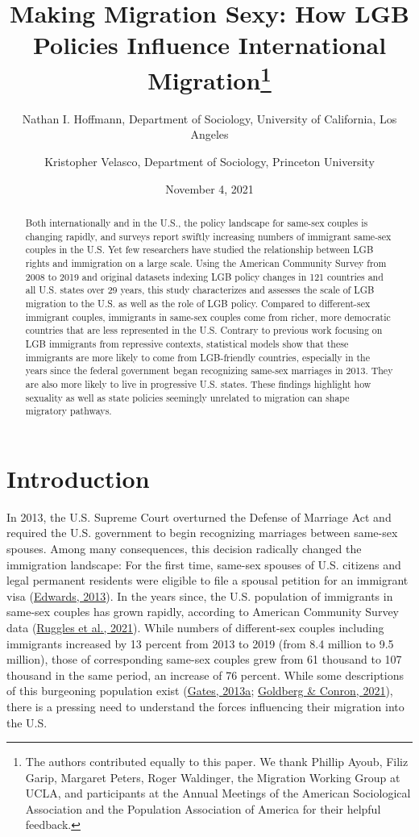 \documentclass[
  12pt,
]{article}
\title{Making Migration Sexy: How LGB Policies Influence International Migration\thanks{The authors contributed equally to this paper. We thank Phillip Ayoub, Filiz Garip, Margaret Peters, Roger Waldinger, the Migration Working Group at UCLA, and participants at the Annual Meetings of the American Sociological Association and the Population Association of America for their helpful feedback.}}
\author{Nathan I. Hoffmann, Department of Sociology, University of California, Los Angeles \and Kristopher Velasco, Department of Sociology, Princeton University}
\date{November 4, 2021}
\begin{document}
\maketitle
\begin{abstract}
Both internationally and in the U.S., the policy landscape for same-sex couples is changing rapidly, and surveys report swiftly increasing numbers of immigrant same-sex couples in the U.S. Yet few researchers have studied the relationship between LGB rights and immigration on a large scale. Using the American Community Survey from 2008 to 2019 and original datasets indexing LGB policy changes in 121 countries and all U.S. states over 29 years, this study characterizes and assesses the scale of LGB migration to the U.S. as well as the role of LGB policy. Compared to different-sex immigrant couples, immigrants in same-sex couples come from richer, more democratic countries that are less represented in the U.S. Contrary to previous work focusing on LGB immigrants from repressive contexts, statistical models show that these immigrants are more likely to come from LGB-friendly countries, especially in the years since the federal government began recognizing same-sex marriages in 2013. They are also more likely to live in progressive U.S. states. These findings highlight how sexuality as well as state policies seemingly unrelated to migration can shape migratory pathways.
\end{abstract}

\hypertarget{introduction}{%
\section{Introduction}\label{introduction}}

In 2013, the U.S. Supreme Court overturned the Defense of Marriage Act and required the U.S. government to begin recognizing marriages between same-sex spouses. Among many consequences, this decision radically changed the immigration landscape: For the first time, same-sex spouses of U.S. citizens and legal permanent residents were eligible to file a spousal petition for an immigrant visa (\protect\hyperlink{ref-edwards_2013}{Edwards, 2013}). In the years since, the U.S. population of immigrants in same-sex couples has grown rapidly, according to American Community Survey data (\protect\hyperlink{ref-ruggles_2021}{Ruggles et al., 2021}). While numbers of different-sex couples including immigrants increased by 13 percent from 2013 to 2019 (from 8.4 million to 9.5 million), those of corresponding same-sex couples grew from 61 thousand to 107 thousand in the same period, an increase of 76 percent. While some descriptions of this burgeoning population exist (\protect\hyperlink{ref-gates_2013}{Gates, 2013a}; \protect\hyperlink{ref-goldberg_2021}{Goldberg \& Conron, 2021}), there is a pressing need to understand the forces influencing their migration into the U.S.
\end{document}
